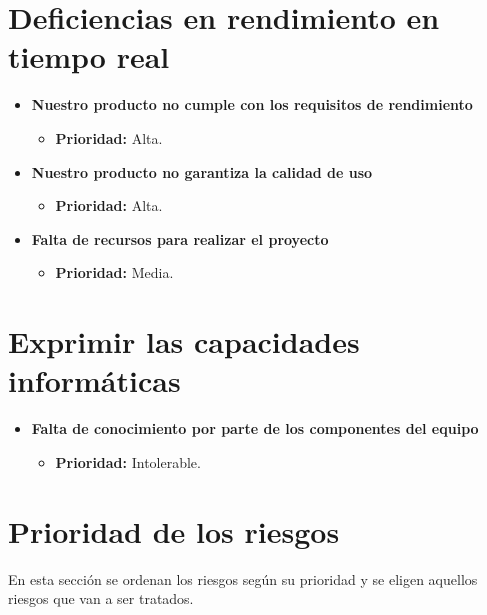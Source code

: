 \documentclass[spanish,a4paper,11pt, twoside]{report}	%
\begin{document}
\section{Deficiencias en rendimiento en tiempo real}
	\begin{itemize}
		\item \textbf{Nuestro producto no cumple con los requisitos de rendimiento}	%
			\begin{itemize}
				\item \textbf{Prioridad: }Alta.
			\end{itemize}
		
		\item \textbf{Nuestro producto no garantiza la calidad de uso}%
			\begin{itemize}
				\item \textbf{Prioridad: }Alta.
			\end{itemize}

		\item \textbf{Falta de recursos para realizar el proyecto}	
			\begin{itemize}
				\item \textbf{Prioridad: }Media.
			\end{itemize}
	\end{itemize}
%
\section{Exprimir las capacidades informáticas}
	\begin{itemize}
		\item \textbf{Falta de conocimiento por parte de los componentes del equipo}	
			\begin{itemize}
				\item \textbf{Prioridad: }Intolerable.
			\end{itemize}
	\end{itemize}
	
\section{Prioridad de los riesgos}
		En esta sección se ordenan los riesgos según su prioridad y se eligen aquellos riesgos que van a ser tratados.\\ \ \\ 
\end{document}
